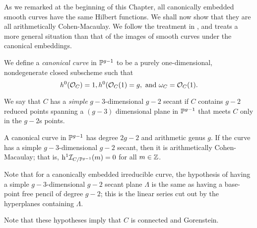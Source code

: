
As we remarked at the beginning of this Chapter, all canonically embedded smooth curves have the same Hilbert functions. We shall now show that they are all arithmetically Cohen-Macaulay.
We follow the treatment in \cite{Schreyer}, and treats a more general situation than that of the 
images of smooth curves under the canonical embeddings.

We define a \emph{canonical curve} in ${\mathbb P}^{g-1}$ to be a purely one-dimensional, nondegenerate closed subscheme  such that
$$
 h^{0}({\mathcal O}_{C}) = 1, h^{0}({\mathcal O}_{C}(1) = g, \hbox{ and } \omega_{C} = {\mathcal O}_{C}(1).
$$

We say that $C$ has a \emph{simple} $g-3$-dimensional $g-2$ secant if $C$ contains $g-2$ reduced points spanning a $(g-3)$ dimensional
plane in ${\mathbb P}^{g-1}$ that meets $C$ only in the $g-2$s points.

\begin{theorem}
A canonical curve in ${\mathbb P}^{g-1}$ has degree $2g-2$ and arithmetic genus $g$. If the curve has a simple
$g-3$-dimensional $g-2$ secant, then it is arithmetically Cohen-Macaulay; that is,
${\rm h}^{1}{\mathcal I}_{C/{\mathbb P}^{g-1}}(m) = 0$ for all $m\in {\mathbb Z}$.
\end{theorem}
 
Note that for a canonically embedded irreducible curve, the hypothesis of having a simple $g-3$-dimensional $g-2$ secant plane $\Lambda$ is the same as having a base-point free pencil of degree $g-2$; this is the linear series 
cut out by the hyperplanes containing $\Lambda$.

 Note that these hypotheses imply that $C$ is connected and Gorenstein.
 
